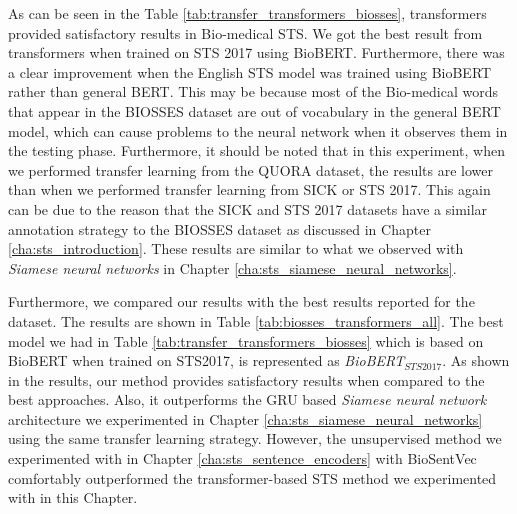 As can be seen in the Table \ref{tab:transfer_transformers_biosses}, transformers provided satisfactory results in Bio-medical STS. We got the best result from transformers when trained on STS 2017 using BioBERT. Furthermore, there was a clear improvement when the English STS model was trained using BioBERT rather than general BERT. This may be because most of the Bio-medical words that appear in the BIOSSES dataset are out of vocabulary in the general BERT model, which can cause problems to the neural network when it observes them in the testing phase. Furthermore, it should be noted that in this experiment, when we performed transfer learning from the QUORA dataset, the results are lower than when we performed transfer learning from SICK or STS 2017. This again can be due to the reason that the SICK and STS 2017 datasets have a similar annotation strategy to the BIOSSES dataset as discussed in Chapter \ref{cha:sts_introduction}. These results are similar to what we observed with \textit{Siamese neural networks} in Chapter \ref{cha:sts_siamese_neural_networks}.

\begin{table}[htb]
	\centering
	\caption[Results comparison for BIOSSES with top results and transformers]{Results for the BIOSSES dataset with transformers compared with top results reported for BIOSSES. For each variant, Pearson Correlation ($\bm{\rho}$) is reported between the predicted values and the gold labels of the test set. }  
	\label{tab:biosses_transformers_all}
\end{table}

Furthermore, we compared our results with the best results reported for the dataset. The results are shown in Table \ref{tab:biosses_transformers_all}. The best model we had in Table \ref{tab:transfer_transformers_biosses} which is based on BioBERT when trained on STS2017, is represented as \textit{BioBERT$_{STS2017}$}. As shown in the results, our method provides satisfactory results when compared to the best approaches. Also, it outperforms the GRU based \textit{Siamese neural network} architecture we experimented in Chapter \ref{cha:sts_siamese_neural_networks} using the same transfer learning strategy. However, the unsupervised method we experimented with in Chapter \ref{cha:sts_sentence_encoders} with BioSentVec \autocite{8904728} comfortably outperformed the transformer-based STS method we experimented with in this Chapter.

